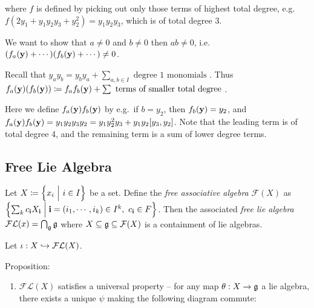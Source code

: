 where \(f\) is defined by picking out only those terms of highest total
degree, e.g.~\(f(2y_1 + y_1y_2y_3 + y_2^2) = y_1y_2y_3\), which is of
total degree 3.

We want to show that \(a\neq 0\) and \(b\neq 0\) then \(ab \neq 0\),
i.e.~\((f_a(\mathbf{y}) + \cdots)(f_b(\mathbf{y}) + \cdots) \neq 0\).

Recall that
\(y_ay_b = y_by_a + \sum_{a,b \in I} \text{ degree 1 monomials }\). Thus
\(f_a(\mathbf{y})(f_b(\mathbf{y})) \coloneqq f_a f_b(\mathbf{y}) + \sum\text{ terms of smaller total degree }\).

Here we define \(f_a(\mathbf{y}) f_b(\mathbf{y})\) by e.g.~if \(b = y_2\),
then \(f_b(\mathbf{y}) = y_2\), and
\(f_a(\mathbf{y}) f_b(\mathbf{y}) = y_1 y_2 y_3 y_2 = y_1 y_2^2 y_3 + y_1y_2[y_3, y_2]\).
Note that the leading term is of total degree 4, and the remaining term
is a sum of lower degree terms.

\hypertarget{free-lie-algebra}{%
\subsection{Free Lie Algebra}\label{free-lie-algebra}}

Let \(X \coloneqq \left\{{x_i {~\mathrel{\Big|}~} i\in I}\right\}\) be a set. Define the
\emph{free associative algebra} \(\mathcal{F}(X)\) as
\(\left\{{\sum_k c_{\mathbf{i}} X_{\mathbf{i}} \mathrel{\Big|} \mathbf{i} = (i_1, \cdots, i_k) \in I^k,~ c_{\mathbf{i}} \in F}\right\}\).
Then the associated \emph{free lie algebra}
\(\mathcal{FL}(x) = \bigcap_{{\mathfrak{g}}} {\mathfrak{g}}\) where
\(X \subseteq {\mathfrak{g}} \subseteq \mathcal{F}(X)\) is a containment of lie
algebras.

Let \(\iota: X \hookrightarrow \mathcal{FL}(X)\).

Proposition:

\begin{enumerate}
\def\labelenumi{\alph{enumi}.}
\tightlist
\item
  \(\mathcal{FL}(X)\) satisfies a universal property -- for any map
  \(\theta: X \to {\mathfrak{g}}\) a lie algebra, there exists a unique \(\psi\)
  making the following diagram commute:
\end{enumerate}

\begin{center}
\end{center}

